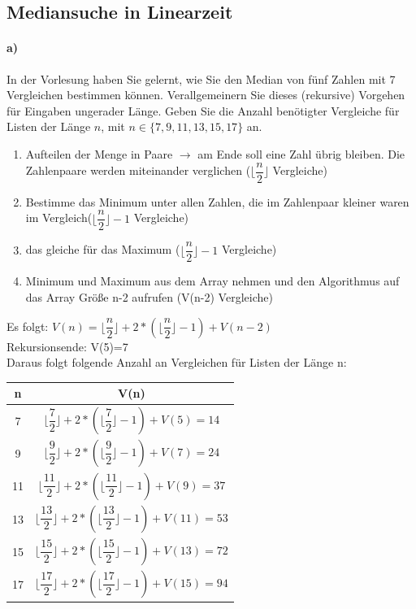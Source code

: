 \documentclass[paper=a4, fontsize=11pt]{scrartcl}
\numberwithin{equation}{section}
\numberwithin{figure}{section}
\numberwithin{table}{section}
\begin{document}
\subsection{Mediansuche in Linearzeit}

\paragraph{a)}
In der Vorlesung haben Sie gelernt, wie Sie den Median von fünf
Zahlen mit 7 Vergleichen bestimmen können. Verallgemeinern Sie
dieses (rekursive) Vorgehen für Eingaben ungerader Länge. Geben Sie
die Anzahl benötigter Vergleiche für Listen der Länge $n$, mit $n\in \{7,9,11,13,15,17\}$ an. \\

\begin{enumerate}
\item Aufteilen der Menge in Paare $\rightarrow$ am Ende soll eine Zahl übrig bleiben. Die Zahlenpaare werden miteinander verglichen ($\lfloor \dfrac{n}{2} \rfloor$ Vergleiche)
\item Bestimme das Minimum unter allen Zahlen, die im Zahlenpaar kleiner waren im Vergleich($\lfloor \dfrac{n}{2} \rfloor -1$ Vergleiche)
\item das gleiche für das Maximum ($\lfloor \dfrac{n}{2} \rfloor -1$ Vergleiche)
\item Minimum und Maximum aus dem Array nehmen und den Algorithmus auf das Array Größe n-2 aufrufen (V(n-2) Vergleiche)
\end{enumerate}

Es folgt: $V(n)=\lfloor \dfrac{n}{2} \rfloor + 2*(\lfloor \dfrac{n}{2} \rfloor -1) +V(n-2) $ \\

Rekursionsende: V(5)=7 \\

Daraus folgt folgende Anzahl an Vergleichen für Listen der Länge n: \\

\begin{tabular}{|c|c|}
\hline
n & V(n) \\\hline
7 & $\lfloor \dfrac{7}{2} \rfloor + 2*(\lfloor \dfrac{7}{2} \rfloor -1) +V(5) = 14$ \\\hline
9 & $\lfloor \dfrac{9}{2} \rfloor + 2*(\lfloor \dfrac{9}{2} \rfloor -1) +V(7) = 24$ \\\hline
11 & $\lfloor \dfrac{11}{2} \rfloor + 2*(\lfloor \dfrac{11}{2} \rfloor -1) +V(9) = 37$ \\\hline
13 & $\lfloor \dfrac{13}{2} \rfloor + 2*(\lfloor \dfrac{13}{2} \rfloor -1) +V(11) = 53$ \\\hline
15 & $\lfloor \dfrac{15}{2} \rfloor + 2*(\lfloor \dfrac{15}{2} \rfloor -1) +V(13) = 72$ \\\hline
17 & $\lfloor \dfrac{17}{2} \rfloor + 2*(\lfloor \dfrac{17}{2} \rfloor -1) +V(15) = 94$ \\\hline
\end{tabular}
\end{document}
